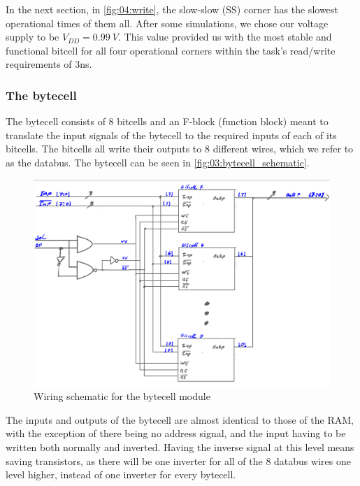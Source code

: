 In the next section, in \autoref{fig:04:write}, the slow-slow (SS) corner has the slowest operational times of them all. After some simulations, we chose our voltage supply to be $V_{DD} = \SI{0.99}{V}$. This value provided us with the most stable and functional bitcell for all four operational corners within the task's read/write requirements of 3ns. 

\subsubsection{The bytecell}
The bytecell consists of 8 bitcells and an F-block (function block) meant to translate the input signals of the bytecell to the required inputs of each of its bitcells. The bitcells all write their outputs to 8 different wires, which we refer to as the databus. The bytecell can be seen in \autoref{fig:03:bytecell_schematic}.

\begin{figure}[H]
    \centering
    \includegraphics[width=0.8\linewidth]{LaTeX_2/Figures/bytecell_schematic.png}
    \caption{Wiring schematic for the bytecell module}
    \label{fig:03:bytecell_schematic}
\end{figure}

The inputs and outputs of the bytecell are almost identical to those of the RAM, with the exception of there being no address signal, and the input having to be written both normally and inverted. Having the inverse signal at this level means saving transistors, as there will be one inverter for all of the 8 databus wires one level higher, instead of one inverter for every bytecell.

